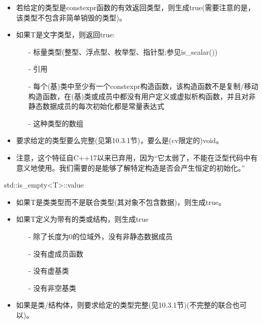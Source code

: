\begin{itemize}
\item 
若给定的类型是constexpr函数的有效返回类型，则生成true(需要注意的是，该类型不包含非简单销毁的类型)。

\item 
如果T是文字类型，则返回true:

\begin{itemize}
\item [-]
标量类型(整型、浮点型、枚举型、指针型;参见is\_scalar())

\item [-]
引用

\item [-]
每个(基)类中至少有一个constexpr构造函数，该构造函数不是复制/移动构造函数，在(基)类或成员中都没有用户定义或虚拟析构函数，并且对非静态数据成员的每次初始化都是常量表达式

\item [-]
这种类型的数组
\end{itemize}

\item 
要求给定的类型要么完整(见第10.3.1节)，要么是(cv限定的)void。

\item 
注意，这个特征自C++17以来已弃用，因为“它太弱了，不能在泛型代码中有意义地使用。我们需要的是能够了解特定构造是否会产生恒定的初始化。”
\end{itemize}

std::is\_empty<T>::value

\begin{itemize}
\item 
如果T是类类型而不是联合类型(其对象不包含数据)，则生成true。

\item 
如果T定义为带有的类或结构，则生成true

\begin{itemize}
\item [-]
除了长度为0的位域外，没有非静态数据成员

\item [-]
没有虚成员函数

\item [-]
没有虚基类

\item [-]
没有非空基类
\end{itemize}

\item 
如果是类/结构体，则要求给定的类型完整(见10.3.1节)(不完整的联合也可以)。
\end{itemize}

